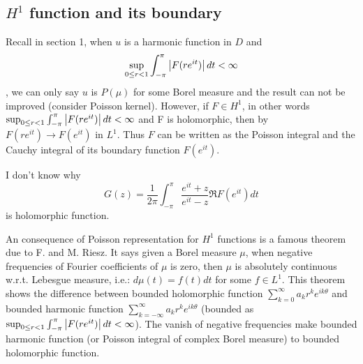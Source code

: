 \subsection{$H^1$ function and its boundary}
Recall in section 1, when $u$ is a harmonic function in $D$ and
\begin{equation*}
    \sup_{0\leq r<1}{\int_{-\pi}^{\pi}\left\lvert F(re^{i t})\right\rvert d t}<\infty
\end{equation*},
we can only say $u$ is $P(\mu)$ for some Borel measure and the result can not be improved (consider Poisson kernel). However, if $F\in H^1$,
in other words $\sup_{0\leq r<1}{\int_{-\pi}^{\pi}\left\lvert F(re^{i t})\right\rvert d t}<\infty$ and F is holomorphic,
then by $F(re^{it})\to F(e^{it})$ in $L^1$. Thus $F$ can be written as the Poisson integral and the Cauchy integral of its boundary function $F(e^{it})$.\par
\begin{remark}
    {\color{blue} I don't know why
        \begin{equation*}
            G(z)=\frac{1}{2\pi}\int_{-\pi}^\pi{\frac{e^{it}+z}{e^{it}-z}\Re{F(e^{it})}d t}
        \end{equation*}
        is holomorphic function}.
\end{remark}
An consequence of Poisson representation for $H^1$ functions is a famous theorem due to F. and M. Riesz. It says given a Borel measure $\mu$,
when negative frequencies of Fourier coefficients of $\mu$ is zero, then $\mu$ is absolutely continuous w.r.t. Lebesgue measure, i.e.:
$d\mu(t)=f(t)d t$ for some $f\in L^1$. This theorem shows the difference between bounded holomorphic function $\sum_{k=0}^\infty{a_kr^{k}e^{i k\theta}}$ and
bounded harmonic function $\sum_{k=-\infty}^\infty{a_kr^{k}e^{i k\theta}}$ (bounded as $\sup_{0\leq r<1}{\int_{-\pi}^{\pi}\left\lvert F(re^{i t})\right\rvert d t}<\infty$).
The vanish of negative frequencies make bounded harmonic function (or Poisson integral of complex Borel measure) to bounded holomorphic function.\par
